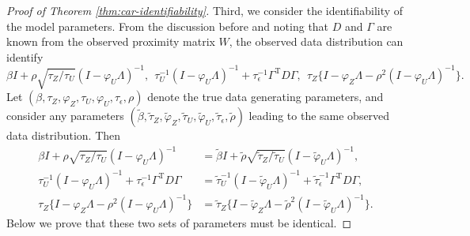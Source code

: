 \documentclass[11pt]{article}
\theoremstyle{definition}
\theoremstyle{remark}
\def\top{{ \mathrm{\scriptscriptstyle T} }}
\begin{document}
\begin{proof}[Proof of Theorem \ref{thm:car-identifiability}]
Third, we consider the identifiability of the model parameters. 
From the discussion before and noting that $D$ and $\Gamma$ are known from the observed proximity matrix $W$, the observed data distribution can  identify 
\begin{equation*}%
    \beta I + \rho \sqrt{\tau_Z/\tau_U} (I-\varphi_U \Lambda)^{-1}, 
    \ \ 
    \tau_U^{-1} (I-\varphi_U \Lambda)^{-1} 
    +\tau_{\epsilon}^{-1} \Gamma^\top D \Gamma, 
    \ \ 
    \tau_Z 
     \big\{ I - \varphi_Z \Lambda - \rho^2 (I - \varphi_U \Lambda)^{-1} \big\}.
\end{equation*}
Let $(\beta, \tau_Z, \varphi_Z, \tau_U, \varphi_U, \tau_{\epsilon}, \rho)$ denote the true data generating parameters, and consider any parameters $(\tilde{\beta}, \tilde{\tau}_Z, \tilde{\varphi}_Z, \tilde{\tau}_U, \tilde{\varphi}_U, \tilde{\tau}_{\epsilon}, \tilde{\rho})$ leading 
to 
the same observed data distribution. Then 
\begin{align}
    \beta I + \rho \sqrt{\tau_Z/\tau_U} (I-\varphi_U \Lambda)^{-1} & = 
    \tilde{\beta} I + \tilde{\rho} \sqrt{\tilde{\tau}_Z/\tilde{\tau}_U} (I-\tilde{\varphi}_U \Lambda)^{-1}, 
    \label{eq:iden_cond_mean_Y_Z}
    \\ 
    \tau_U^{-1} (I-\varphi_U \Lambda)^{-1} 
    +\tau_{\epsilon}^{-1} \Gamma^\top D \Gamma
    & = 
    \tilde{\tau}_U^{-1} (I-\tilde{\varphi}_U \Lambda)^{-1} 
    +\tilde{\tau}_{\epsilon}^{-1} \Gamma^\top D \Gamma, 
    \label{eq:iden_var_mean_Y_Z}
    \\ 
    \tau_Z \big\{ I - \varphi_Z \Lambda - \rho^2 (I - \varphi_U \Lambda)^{-1} \big\}
    & = 
    \tilde{\tau}_Z \big\{ I - \tilde{\varphi}_Z \Lambda - \tilde{\rho}^2 (I - \tilde{\varphi}_U \Lambda)^{-1} \big\}.
    \label{eq:prec_Z}
\end{align}
Below we prove that these two sets of parameters must be identical. 


\end{proof}
\end{document}
